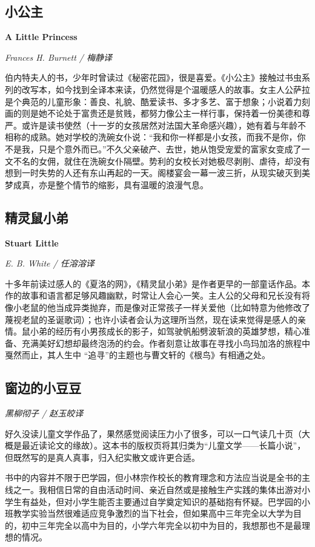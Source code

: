 \subsection*{小公主}
\par \textbf{A Little Princess}
\par \emph{Frances H. Burnett / 梅静译} 
\par 伯内特夫人的书，少年时曾读过《秘密花园》，很是喜爱。《小公主》接触过书虫系列的改写本，如今找到全译本来读，仍然觉得是个温暖感人的故事。女主人公萨拉是个典范的儿童形象：善良、礼貌、酷爱读书、多才多艺、富于想象；小说着力刻画的则是她不论处于富贵还是贫贱，都努力像公主一样行事，保持着一份美德和尊严。或许是读书使然（十一岁的女孩居然对法国大革命感兴趣），她有着与年龄不相称的成熟。她对学校的洗碗女仆说：“我和你一样都是小女孩，而我不是你，你不是我，只是个意外而已。”不久父亲破产、去世，她从饱受宠爱的富家女变成了一文不名的女佣，就住在洗碗女仆隔壁。势利的女校长对她极尽剥削、虐待，却没有想到一时失势的人还有东山再起的一天。阁楼宴会一幕一波三折，从现实破灭到美梦成真，亦是整个情节的缩影，具有温暖的浪漫气息。
\par {}

\subsection*{精灵鼠小弟}
\par \textbf{Stuart Little}
\par \emph{E. B. White / 任溶溶译} 

\par 十多年前读过感人的《夏洛的网》，《精灵鼠小弟》是作者更早的一部童话作品。本作的故事和语言都足够风趣幽默，时常让人会心一笑。主人公的父母和兄长没有将像小老鼠的他当成异类抛弃，而是像对正常孩子一样关爱他（比如特意为他修改了蔑视老鼠的圣诞歌词）；也许小读者会认为这理所当然，现在读来觉得是感人的亲情。鼠小弟的经历有小男孩成长的影子，如驾驶帆船劈波斩浪的英雄梦想，精心准备、充满美好幻想却最终泡汤的约会。作者刻意让故事在寻找小鸟玛加洛的旅程中戛然而止，其人生中 “追寻”的主题也与曹文轩的《根鸟》有相通之处。
\par {}


\subsection*{窗边的小豆豆}
\par \emph{黑柳彻子 / 赵玉皎译} 
\par 好久没读儿童文学作品了，果然感觉阅读压力小了很多，可以一口气读几十页（大概是最近读论文的缘故）。这本书的版权页将其归类为“儿童文学——长篇小说”，但既然写的是真人真事，归入纪实散文或许更合适。
\par 书中的内容并不限于巴学园，但小林宗作校长的教育理念和方法应当说是全书的主线之一。我相信日常的自由活动时间、亲近自然或是接触生产实践的集体出游对小学生有益处，但对小学生能否主要通过自学奠定知识的基础抱有怀疑。巴学园的小班教学实验当然很难适应竞争激烈的当下社会，但如果高中三年完全以大学为目的，初中三年完全以高中为目的，小学六年完全以初中为目的，我想那也不是最理想的情况。
\par {}

